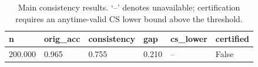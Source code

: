 \begin{table}[t]
\centering
\begin{tabular}{llllll}
\toprule
n & orig_acc & consistency & gap & cs_lower & certified \\
\midrule
200.000 & 0.965 & 0.755 & 0.210 & -- & False \\
\bottomrule
\end{tabular}
\caption{Main consistency results. `--' denotes unavailable; certification requires an anytime-valid CS lower bound above the threshold.}
\end{table}
